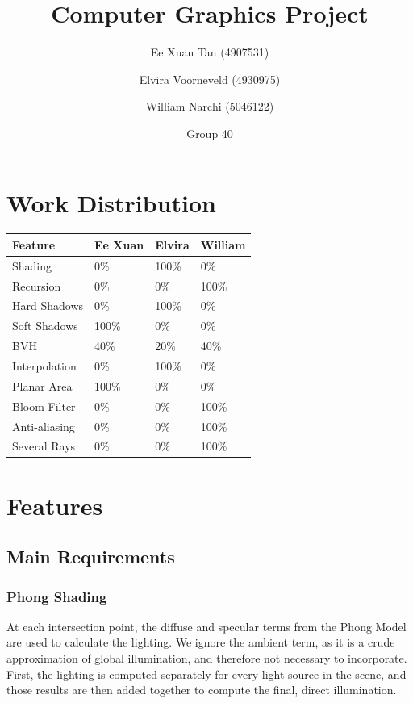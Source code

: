 \documentclass{article}
\author{Ee Xuan Tan (4907531) \and Elvira Voorneveld (4930975) \and William Narchi (5046122)}
\date{Group 40}
\title{Computer Graphics Project}
\begin{document}
    \maketitle

    \section{Work Distribution}
    
    \begin{tabular}{ |p{2.5cm}||p{2.5cm}|p{2.5cm}|p{2.5cm}| }
        \hline
        \textbf{Feature} &\textbf{Ee Xuan} &\textbf{Elvira} &\textbf{William}\\
        \hline
        Shading                        &0\%    &100\%  &0\%\\
        Recursion                      &0\%    &0\%    &100\%\\
        Hard Shadows                   &0\%    &100\%  &0\%\\
        Soft Shadows                   &100\%  &0\%    &0\%\\
        BVH                            &40\%   &20\%   &40\%\\
        Interpolation                  &0\%    &100\%  &0\%\\
        Planar Area                    &100\%  &0\%    &0\%\\
        Bloom Filter                   &0\%    &0\%    &100\%\\
        Anti-aliasing                  &0\%    &0\%    &100\%\\
        Several Rays                   &0\%    &0\%    &100\%\\
        \hline
    \end{tabular}

    \section{Features}
    \subsection{Main Requirements}
    \subsubsection{Phong Shading}
    At each intersection point, the diffuse and specular terms from the Phong Model are used to calculate the 
    lighting. We ignore the ambient term, as it is a crude approximation of global illumination, and therefore 
    not necessary to incorporate. First, the lighting is computed separately for every light source in the 
    scene, and those results are then added together to compute the final, direct illumination.
\end{document}
